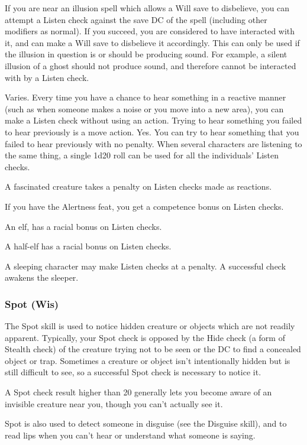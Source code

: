  If you are near an illusion spell which allows a Will save to disbelieve, you can attempt a Listen check against the save DC of the spell (including other modifiers as normal). If you succeed, you are considered to have interacted with it, and can make a Will save to disbelieve it accordingly. This can only be used if the illusion in question is or should be producing sound. For example, a silent illusion of a ghost should not produce sound, and therefore cannot be interacted with by a Listen check.

 Varies. Every time you have a chance to hear something in a reactive manner (such as when someone makes a noise or you move into a new area), you can make a Listen check without using an action. Trying to hear something you failed to hear previously is a move action.
 Yes. You can try to hear something that you failed to hear previously with no penalty.
 When several characters are listening to the same thing, a single 1d20 roll can be used for all the individuals' Listen checks.
\par A fascinated creature takes a   penalty on Listen checks made as reactions.
\par If you have the Alertness feat, you get a  competence bonus on Listen checks.
\par An elf, has a  racial bonus on Listen checks.
\par A half-elf has a  racial bonus on Listen checks.
\par A sleeping character may make Listen checks at a  penalty. A successful check awakens the sleeper.

\subsubsection{Spot (Wis)}
 The Spot skill is used to notice hidden creature or objects which are not readily apparent. Typically, your Spot check is opposed by the Hide check (a form of Stealth check) of the creature trying not to be seen or the DC to find a concealed object or trap. Sometimes a creature or object isn't intentionally hidden but is still difficult to see, so a successful Spot check is necessary to notice it.

A Spot check result higher than 20 generally lets you become aware of an invisible creature near you, though you can't actually see it.

Spot is also used to detect someone in disguise (see the Disguise skill), and to read lips when you can't hear or understand what someone is saying.

